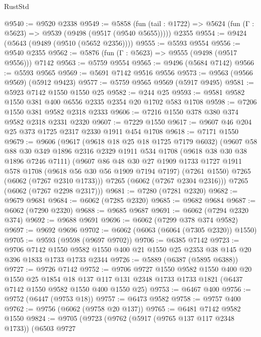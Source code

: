\begin{lexlean}{RustStd}
\begin{coremodule}
@9540 := @9520 @2338
@9549 := @5858
    (fun (tail : @1722) => @5624 (fun (Γ : @5623) => @9539 (@9498 (@9517 (@9540 @5655)))))
    @2355
@9554 := @9424 (@5643 (@9489 (@9510 (@5652 @2356))))
@9555 := @5593 @9554
@9556 := @9540 @2355
@9562 := @5876 (fun (Γ : @5623) => @9555 (@9498 (@9517 @9556))) @7142
@9563 := @5759 @9554
@9565 := @9496 (@5684 @7142)
@9566 := @5593 @9565
@9569 := @5691 @7142 @9516 @9556
@9573 := @9563 (@9566 @9569) (@5912 @9423)
@9577 := @5759 @9565 @9569 (@5917 @9495)
@9581 := @5923 @7142 @1550 @1550 @25
@9582 := @244 @25
@9593 := @9581 @9582 @1550 @381 @400 @6556 @2335 @2354 @20 @1702 @583 @1708
@9598 := @7206 @1550 @381 @9582 @2318 @2333
@9606 := @7216 @1550 @378 @380 @374 @9582 @2318 @2331 @2320
@9607 := @7229 @1550
@9617 := @9607 @46 @204 @25 @373 @1725 @2317 @2330 @1911 @454 @1708
@9618 := @7171 @1550
@9679 := @9606
    (@9617
      (@9618 @18 @25 @18 @1725 @7179 @6032)
      (@9607
        @58
        @88
        @30
        @349
        @1896
        @2316
        @2329
        @1911
        @534
        @1708
        (@9618 @38 @30 @38 @1896 @7246 @7111)
        (@9607
          @86
          @48
          @30
          @27
          @1909
          @1733
          @1727
          @1911
          @578
          @1708
          (@9618 @56 @30 @56 @1909 @7194 @7197)
          (@7261 @1550)
          @7265
          (@6062 (@7267 @2310 @1733)))
        @7265
        (@6062 (@7267 @2304 @2316)))
      @7265
      (@6062 (@7267 @2298 @2317)))
@9681 := @7280 (@7281 @2320)
@9682 := @9679 @9681
@9684 := @6062 (@7285 @2320)
@9685 := @9682 @9684
@9687 := @6062 (@7290 @2320)
@9688 := @9685 @9687
@9691 := @6062 (@7294 @2320 @374)
@9692 := @9688 @9691
@9696 := @6062 (@7299 @378 @374 @9582)
@9697 := @9692 @9696
@9702 := @6062 (@6063 (@6064 (@7305 @2320)) @1550)
@9705 := @9593 (@9598 (@9697 @9702))
@9706 := @6385 @7142
@9723 := @9706
    @7142
    @1550
    @9582
    @1550
    @400
    @21
    @1550
    @25
    @2353
    @38
    @145
    @20
    @396
    @1833
    @1733
    @1733
    @2344
@9726 := @5889 (@6387 (@5895 @6388))
@9727 := @9726 @7142
@9752 := @9706
    @9727
    @1550
    @9582
    @1550
    @400
    @20
    @1550
    @25
    @1854
    @18
    @137
    @117
    @131
    @2348
    @1733
    @1733
    @1821
    (@6437 @7142 @1550 @9582 @1550 @400 @1550 @25)
@9753 := @6467 @400
@9756 := @9752 (@6447 (@9753 @18))
@9757 := @6473 @9582
@9758 := @9757 @400
@9762 := @9756 (@6062 (@9758 @20 @137))
@9765 := @6481 @7142 @9582 @1550
@9824 := @9705
    (@9723
      (@9762
        (@5917 (@9765 @137 @117 @2348 @1733))
        (@6503
          @9727

\end{coremodule}
\end{lexlean}

